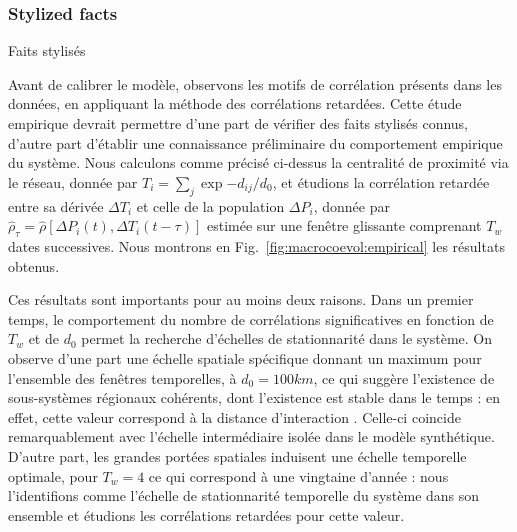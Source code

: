 \subsubsection{Stylized facts}{Faits stylisés}


Avant de calibrer le modèle, observons les motifs de corrélation présents dans les données, en appliquant la méthode des corrélations retardées. Cette étude empirique devrait permettre d'une part de vérifier des faits stylisés connus, d'autre part d'établir une connaissance préliminaire du comportement empirique du système. Nous calculons comme précisé ci-dessus la centralité de proximité via le réseau, donnée par $T_i = \sum_j \exp{-d_{ij}/d_0}$, et étudions la corrélation retardée entre sa dérivée $\Delta T_i$ et celle de la population $\Delta P_i$, donnée par $\hat{\rho}_{\tau} = \hat{\rho}\left[\Delta P_i(t),\Delta T_i(t-\tau)\right]$ estimée sur une fenêtre glissante comprenant $T_w$ dates successives. Nous montrons en Fig.~\ref{fig:macrocoevol:empirical} les résultats obtenus.


Ces résultats sont importants pour au moins deux raisons. Dans un premier temps, le comportement du nombre de corrélations significatives en fonction de $T_w$ et de $d_0$ permet la recherche d'échelles de stationnarité dans le système. On observe d'une part une échelle spatiale spécifique donnant un maximum pour l'ensemble des fenêtres temporelles, à $d_0 = 100km$, ce qui suggère l'existence de sous-systèmes régionaux cohérents, dont l'existence est stable dans le temps : en effet, cette valeur correspond à la distance d'interaction . Celle-ci coincide remarquablement avec l'échelle intermédiaire isolée dans le modèle synthétique. D'autre part, les grandes portées spatiales induisent une échelle temporelle optimale, pour $T_w = 4$ ce qui correspond à une vingtaine d'année : nous l'identifions comme l'échelle de stationnarité temporelle du système dans son ensemble et étudions les corrélations retardées pour cette valeur.



